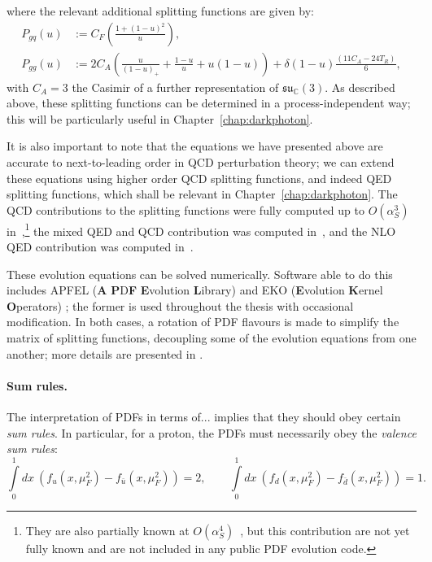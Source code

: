 \documentclass[withindex,glossary]{cam-thesis}
\begin{document}
where the relevant additional splitting functions are given by:
\begin{align}
P_{gq}(u) &:= C_F \left( \frac{1 + (1-u)^2}{u} \right),\\[1.5ex]
P_{gg}(u) &:= 2 C_A \left( \frac{u}{(1-u)_+} + \frac{1-u}{u} + u(1-u) \right) + \delta(1-u) \frac{(11C_A - 24 T_R)}{6},
\end{align}
with $C_A = 3$ the Casimir of a further representation of $\mathfrak{su}_\mathbb{C}(3)$. As described above, these splitting functions can be determined in a process-independent way; this will be particularly useful in Chapter~\ref{chap:darkphoton}.

It is also important to note that the equations we have presented above are accurate to next-to-leading order in QCD perturbation theory; we can extend these equations using higher order QCD splitting functions, and indeed QED splitting functions, which shall be relevant in Chapter~\ref{chap:darkphoton}. The QCD contributions
to the splitting functions were fully computed up to $O(\alpha_S^3)$
in~\cite{Vogt:2004mw,Moch:2004pa,Blumlein:2021enk},\footnote{They are also partially
  known at $O(\alpha_S^4)$~\cite{Moch:2021qrk}, but this contribution
  are not yet fully known and are not included in any public 
PDF evolution code.} the mixed QED and QCD contribution
was computed in~\cite{deFlorian:2015ujt}, and the NLO QED contribution was computed in~\cite{deFlorian:2016gvk}.

These evolution equations can be solved numerically. Software able to do this includes APFEL (\textbf{A} \textbf{P}D\textbf{F} \textbf{E}volution \textbf{L}ibrary) \cite{Bertone:2013vaa} and EKO (\textbf{E}volution \textbf{K}ernel \textbf{O}perators) \cite{Candido:2022tld}; the former is used throughout the thesis with occasional modification. In both cases, a rotation of PDF flavours is made to simplify the matrix of splitting functions, decoupling some of the evolution equations from one another; more details are presented in \cite{Bertone:2013vaa}.

\paragraph{Sum rules.} The interpretation of PDFs in terms of... implies that they should obey certain \textit{sum rules}. In particular, for a proton, the PDFs must necessarily obey the \textit{valence sum rules}:
\begin{equation}
\int\limits_{0}^{1} dx\ \left( f_u(x,\mu_F^2) - f_{\bar{u}}(x,\mu_F^2) \right) = 2, \qquad \int\limits_{0}^{1} dx\ \left( f_d(x,\mu_F^2) - f_{\bar{d}}(x,\mu_F^2) \right) = 1.
\end{equation} 
\end{document}
